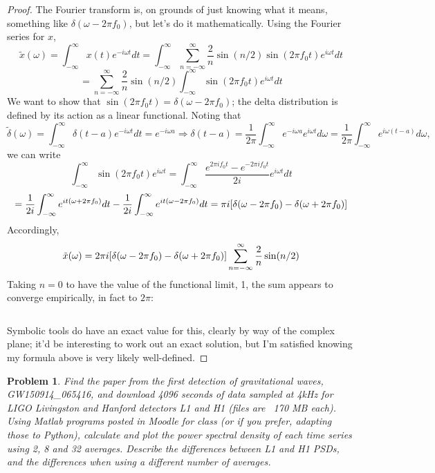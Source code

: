 \documentclass{article}
\newtheorem{plm}{Problem}
\begin{document}
\begin{proof}
  The Fourier transform is, on grounds of just knowing what it means, something like $\delta(\omega - 2\pi f_{0})$, but let's do it mathematically.
  Using the Fourier series for $x$,
  \[
    \tilde{x}(\omega) = \int_{-\infty}^{\infty}x(t)e^{-i\omega t}dt
    = \int_{-\infty}^{\infty}\sum_{n = -\infty}^{\infty}\frac{2}{n}\sin(n/2)\sin(2\pi f_{0} t)e^{i\omega t}dt
  \]
  \[
    = \sum_{n=-\infty}^{\infty}\frac{2}{n}\sin(n/2)\int_{-\infty}^{\infty}\sin(2\pi f_{0} t)e^{i \omega t}dt
  \]
  We want to show that $\sin(2\pi f_{0}t) = \delta(\omega - 2\pi f_{0})$; the delta distribution is defined by its action as a linear functional.
  Noting that
  \[
    \tilde{\delta}(\omega) = \int_{-\infty}^{\infty}\delta(t - a)e^{-i\omega t}dt = e^{-i\omega a}
    \Rightarrow \delta(t-a) = \frac{1}{2\pi}\int_{-\infty}^{\infty}e^{-i\omega a}e^{i\omega t}d\omega = \frac{1}{2\pi}\int_{-\infty}^{\infty}e^{i\omega (t-a)}d\omega,
  \]
  we can write
  \[
    \int_{-\infty}^{\infty}\sin(2\pi f_{0}t)e^{i\omega t} = \int_{-\infty}^{\infty}\frac{e^{2\pi if_{0}t}-e^{-2\pi if_{0}t}}{2i}e^{i\omega t}dt
  \]
  \[
    = \frac{1}{2i}\int_{-\infty}^{\infty}e^{it(\omega + 2\pi f_{0})}dt - \frac{1}{2i}\int_{-\infty}^{\infty}e^{it(\omega - 2\pi f_{0})}dt
    = \pi i\qty[\delta(\omega - 2\pi f_{0}) - \delta(\omega + 2\pi f_{0})]
  \]
  Accordingly,
  \[
    \tilde{x}(\omega) = 2\pi i\qty[\delta(\omega - 2\pi f_{0}) - \delta(\omega + 2\pi f_{0})]\sum_{n = -\infty}^{\infty}\frac{2}{n}\sin(n/2)
  \]
  Taking $n = 0$ to have the value of the functional limit, 1, the sum appears to converge empirically, in fact to $2\pi$:
  \inputminted{scheme}{sum.scm}
  Symbolic tools do have an exact value for this, clearly by way of the complex plane; it'd be interesting to work out an exact solution,
  but I'm satisfied knowing my formula above is very likely well-defined.
\end{proof}

\newpage

\begin{plm}
  Find the paper from the first detection of gravitational waves, GW150914\_065416,
  and download 4096 seconds of data sampled at 4kHz for LIGO Livingston and Hanford detectors L1 and H1 (files are ~170 MB each).
  Using Matlab programs posted in Moodle for class (or if you prefer, adapting those to Python),
  calculate and plot the power spectral density of each time series using 2, 8 and 32 averages.
  Describe the differences between L1 and H1 PSDs, and the differences when using a different number of averages.
\end{plm}
\end{document}
